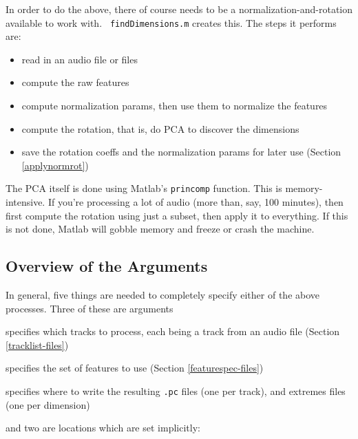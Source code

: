 \documentclass[11pt]{article}
\begin{document}
In order to do the above, there of course needs to be a
normalization-and-rotation available to work with.  {\tt
  findDimensions.m} creates this.  The steps it performs are:
\begin{itemize}   \setlength{\itemsep}{0pt}\setlength{\parskip}{0pt}
\item read in an audio file or files
\item compute the raw  features
\item compute normalization params, then use them to normalize the features
\item compute the rotation, that is, do PCA to discover the dimensions
\item save the rotation coeffs and the normalization params for later use (Section \ref{applynormrot})
\end{itemize}

The PCA itself is done using Matlab's {\tt princomp} function.  This
is memory-intensive.  If you're processing a lot of audio (more than,
say, 100 minutes), then first compute the rotation using just a
subset, then apply it to everything.  If this is not done, Matlab
will gobble memory and freeze or crash the machine.


\subsection{Overview of the Arguments}   \label{arguments}

In general,  five things are  needed to completely specify either
of the above processes.  Three of these are arguments

\begin{description}  \setlength{\itemsep}{0pt}\setlength{\parskip}{0pt}
\item[tracklist] specifies which tracks to process, each being a
  track from an audio file (Section \ref{tracklist-files})
\item[featurespec file]  specifies the set of features to use (Section \ref{featurespec-files})
\item[output dir] specifies where to write the resulting {\tt .pc}
  files (one per track), and extremes files (one per dimension)
\end{description}

and two  are locations which are set implicitly:
\end{document}
